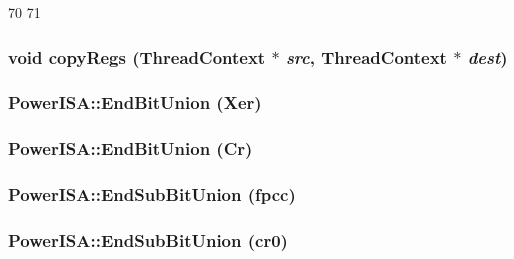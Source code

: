 \begin{DoxyCode}
70 {
71 }
\end{DoxyCode}
\hypertarget{namespacePowerISA_aaeffcccf262b0dbd3cbcc8b4cef41168}{
\subsubsection[{copyRegs}]{\setlength{\rightskip}{0pt plus 5cm}void copyRegs ({\bf ThreadContext} $\ast$ {\em src}, \/  {\bf ThreadContext} $\ast$ {\em dest})}}
\label{namespacePowerISA_aaeffcccf262b0dbd3cbcc8b4cef41168}
\hypertarget{namespacePowerISA_ac66016fe59d55012354269c3c5af1d1e}{
\subsubsection[{EndBitUnion}]{\setlength{\rightskip}{0pt plus 5cm}PowerISA::EndBitUnion (Xer)}}
\label{namespacePowerISA_ac66016fe59d55012354269c3c5af1d1e}
\hypertarget{namespacePowerISA_a4a1bb83cbbdd34b9536fd20979976f34}{
\subsubsection[{EndBitUnion}]{\setlength{\rightskip}{0pt plus 5cm}PowerISA::EndBitUnion (Cr)}}
\label{namespacePowerISA_a4a1bb83cbbdd34b9536fd20979976f34}
\hypertarget{namespacePowerISA_aed02f125b7f5d4836bf0489108247f55}{
\subsubsection[{EndSubBitUnion}]{\setlength{\rightskip}{0pt plus 5cm}PowerISA::EndSubBitUnion (fpcc)}}
\label{namespacePowerISA_aed02f125b7f5d4836bf0489108247f55}
\hypertarget{namespacePowerISA_ae2d645019d37ae932cad3b1435ebe638}{
\subsubsection[{EndSubBitUnion}]{\setlength{\rightskip}{0pt plus 5cm}PowerISA::EndSubBitUnion (cr0)}}
